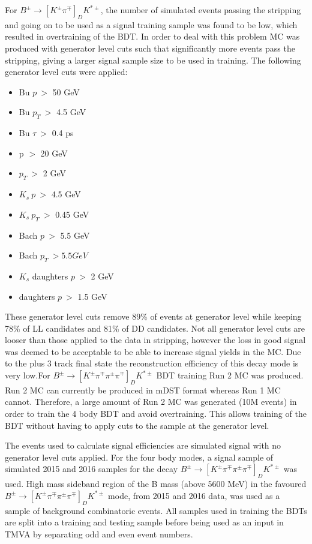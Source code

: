 For $B^{\pm} \to [K^{\pm}\pi^{\mp}]_D K^{*\pm}$, the number of simulated events passing the stripping and going on to be used as a signal training sample was found to be low, which resulted in overtraining of the BDT. In order to deal with this problem MC was produced with generator level cuts such that significantly more events pass the stripping, giving a larger signal sample size to be used in training. The following generator level cuts were applied:

\begin{itemize}
\item{Bu $p\ >$ 50 GeV}
\item{Bu $p_T\ >$ 4.5 GeV}
\item{Bu $\tau\ >$ 0.4 ps}
\item{\Dz p $>$ 20 GeV}
\item{\Dz $p_T\ >$ 2 GeV}
\item{$K_s\ p\ >$ 4.5 GeV}
\item{$K_s\ p_T\ >$ 0.45 GeV}
\item{Bach $p\ >$ 5.5 GeV}
\item{Bach $p_T\ > 5.5 GeV$}
\item{$K_s$ daughters $p\ >$ 2 GeV}
\item{\Dz daughters $p\ >$ 1.5 GeV}
\end{itemize}

These generator level cuts remove 89\% of events at generator level while keeping 78\% of LL candidates and 81\% of DD candidates. Not all generator level cuts are looser than those applied to the data in stripping, however the loss in good signal was deemed to be acceptable to be able to increase signal yields in the MC. Due to the \KS plus 3 track final state the reconstruction efficiency of this decay mode is very low.For $B^{\pm} \to [K^{\pm}\pi^{\mp}\pi^{\pm}\pi^{\mp}]_D K^{*\pm}$ BDT training Run 2 MC was produced. Run 2 MC can currently be produced in mDST format whereas Run 1 MC cannot. Therefore, a large amount of Run 2 MC was generated (10M events) in order to train the 4 body BDT and avoid overtraining. This allows training of the BDT without having to apply cuts to the sample at the generator level.

The events used to calculate signal efficiencies are simulated signal with no generator level cuts applied. For the four body modes, a signal sample of simulated 2015 and 2016 samples for the decay $B^{\pm} \to [K^{\pm}\pi^{\mp}\pi^{\pm}\pi^{\mp}]_D K^{*\pm}$ was used. High mass sideband region of the B mass (above 5600 MeV) in the favoured $B^{\pm} \to [K^{\pm}\pi^{\mp}\pi^{\pm}\pi^{\mp}]_D K^{*\pm}$ mode, from 2015 and 2016 data, was used as a sample of background combinatoric events. All samples used in training the BDTs are split into a training and testing sample before being used as an input in TMVA by separating odd and even event numbers.

